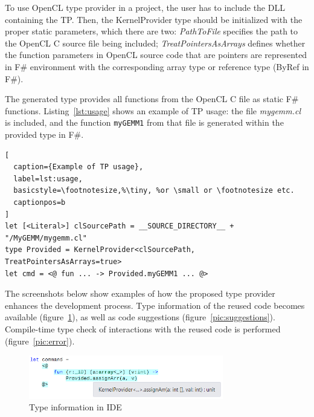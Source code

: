 \documentclass[sigplan,review]{acmart}\settopmatter{printfolios=true}
\begin{document}
To use OpenCL type provider in a project, the user has to include the DLL containing the TP.
Then, the KernelProvider type should be initialized with the proper static parameters, which there are two: \textit{PathToFile} specifies the path to the OpenCL C source file being included;
\textit{TreatPointersAsArrays} defines whether the function parameters in OpenCL source code that are pointers are represented in F\# environment with the corresponding array type or reference type (ByRef in F\#).


The generated type provides all functions from the OpenCL C file as static F\# functions.
Listing~\ref{lst:usage} shows an example of TP usage: the file \textit{mygemm.cl} is included, and the function \lstinline{myGEMM1} from that file is generated within the provided type in F\#.



\lstset{language=FSharp}
\begin{lstlisting}[
  caption={Example of TP usage},
  label=lst:usage,
  basicstyle=\footnotesize,%\tiny, %or \small or \footnotesize etc.
  captionpos=b
]
let [<Literal>] clSourcePath = __SOURCE_DIRECTORY__ + "/MyGEMM/mygemm.cl"
type Provided = KernelProvider<clSourcePath, TreatPointersAsArrays=true>
let cmd = <@ fun ... -> Provided.myGEMM1 ... @>
\end{lstlisting}

The screenshots below show examples of how the proposed type provider enhances the development process. Type information of the reused code becomes available (figure~\ref{pic:intellisense}), as well as code suggestions (figure~\ref{pic:suggestions}). Compile-time type check of interactions with the reused code is performed (figure~\ref{pic:error}).

\begin{figure}[h]
\centering
\includegraphics[width=8.5cm]{graphics/example-suggestion.png}
\caption{Type information in IDE}
\label{pic:intellisense}
\end{figure}
\end{document}
